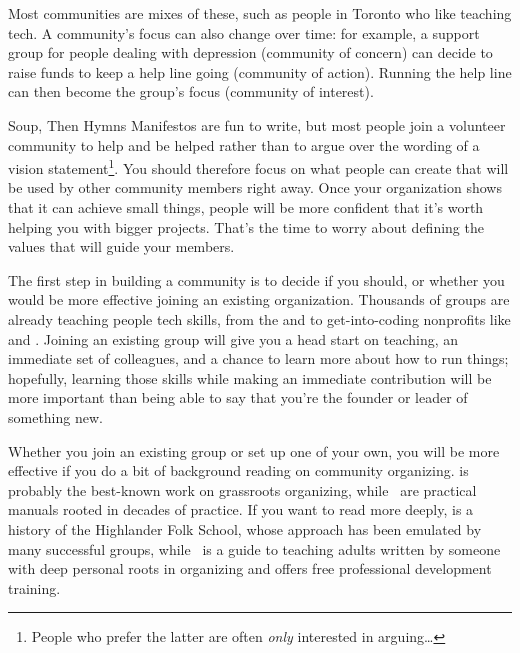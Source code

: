 Most communities are mixes of these,
such as people in Toronto who like teaching tech.
A community's focus can also change over time:
for example,
a support group for people dealing with depression (community of concern)
can decide to raise funds to keep a help line going (community of action).
Running the help line can then become the group's focus (community of interest).

\begin{aside}{Soup, Then Hymns}
  Manifestos are fun to write,
  but most people join a volunteer community to help and be helped
  rather than to argue over the wording of a vision statement\footnote{
    People who prefer the latter are often \emph{only} interested in arguing{\ldots}}.
  You should therefore focus on
  what people can create that will be used by other community members right away.
  Once your organization shows that it can achieve small things,
  people will be more confident that it's worth helping you with bigger projects.
  That's the time to worry about defining the values that will guide your members.
\end{aside}


The first step in building a community is to decide if you should,
or whether you would be more effective joining an existing organization.
Thousands of groups are already teaching people tech skills,
from the 
and 
to get-into-coding nonprofits like
and .
Joining an existing group will give you a head start on teaching,
an immediate set of colleagues,
and a chance to learn more about how to run things;
hopefully,
learning those skills while making an immediate contribution
will be more important than being able to say that
you're the founder or leader of something new.

Whether you join an existing group or set up one of your own,
you will be more effective if you do a bit of background reading on community organizing.
\cite{Alin1989,Lake2018} is probably the best-known work on grassroots organizing,
while~\cite{Brow2007,Midw2010,Lake2018} are practical manuals rooted in decades of practice.
If you want to read more deeply,
\cite{Adam1975} is a history of the Highlander Folk School,
whose approach has been emulated by many successful groups,
while~\cite{Spal2014} is a guide to teaching adults
written by someone with deep personal roots in organizing
and 
offers free professional development training.

